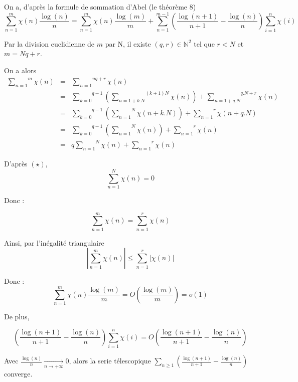 On a, d'apr{\`e}s la formule de sommation d'Abel (le th{\'e}or{\`e}me 8)
\[ \overset{m}{\underset{n = 1}{\sum}} \chi (n) \frac{\log (n)}{n} =
   \overset{m}{\underset{n = 1}{\sum}} \chi (n) \frac{\log (m)}{m} +
   \overset{m - 1}{\underset{n = 1}{\sum}} \left( \frac{\log (n + 1)}{n + 1} -
   \frac{\log (n)}{n} \right) \overset{n}{\underset{i = 1}{\sum}} \chi (i) \]


Par la division euclidienne de $m$ par N, il existe $(q, r) \in \mathbb{N}^2$
tel que $r < N$ et $m = N q + r$.

On a alors
\begin{eqnarray*}
  \overset{m}{\underset{n = 1}{\sum}} \chi (n) & = & \overset{n q +
  r}{\underset{n = 1}{\sum}} \chi (n)\\
  & = & \overset{q - 1}{\underset{k = 0}{\sum}} \left( \overset{(k + 1)
  N}{\underset{n = 1 + k.N}{\sum}} \chi (n) \right) + \overset{q.N +
  r}{\underset{n = 1 + q.N}{\sum}} \chi (n)\\
  & = & \overset{q - 1}{\underset{k = 0}{\sum}} \left(
  \overset{N}{\underset{n = 1}{\sum}} \chi (n + k.N) \right) +
  \overset{r}{\underset{n = 1}{\sum}} \chi (n + q.N)\\
  & = & \overset{q - 1}{\underset{k = 0}{\sum}} \left(
  \overset{N}{\underset{n = 1}{\sum}} \chi (n) \right) +
  \overset{r}{\underset{n = 1}{\sum}} \chi (n)\\
  & = & q \overset{N}{\underset{n = 1}{\sum}} \chi (n) +
  \overset{r}{\underset{n = 1}{\sum}} \chi (n)
\end{eqnarray*}


D'apr{\`e}s $(\star)$,
\[ \overset{N}{\underset{n = 1}{\sum}} \chi (n) = 0 \]


Donc :


\[ \overset{m}{\underset{n = 1}{\sum}} \chi (n) = \overset{r}{\underset{n =
   1}{\sum}} \chi (n) \]


Ainsi, par l'in{\'e}galit{\'e} triangulaire
\[ \left| \overset{m}{\underset{n = 1}{\sum}} \chi (n) \right| \leqslant
   \overset{r}{\underset{n = 1}{\sum}} | \chi (n) | \]


Donc :
\[ \overset{m}{\underset{n = 1}{\sum}} \chi (n) \frac{\log (m)}{m} = O \left(
   \frac{\log (m)}{m} \right) = o (1) \]


De plus,


\[ \left( \frac{\log (n + 1)}{n + 1} - \frac{\log (n)}{n} \right)
   \overset{n}{\underset{i = 1}{\sum}} \chi (i) = O \left( \frac{\log (n +
   1)}{n + 1} - \frac{\log (n)}{n} \right) \]


Avec $\frac{\log (n)}{n} \underset{n \longrightarrow +
\infty}{\longrightarrow} 0$, alors la serie t{\'e}lescopique $\underset{n
\geqslant 1}{\sum} \left( \frac{\log (n + 1)}{n + 1} - \frac{\log (n)}{n}
\right)$ converge.

